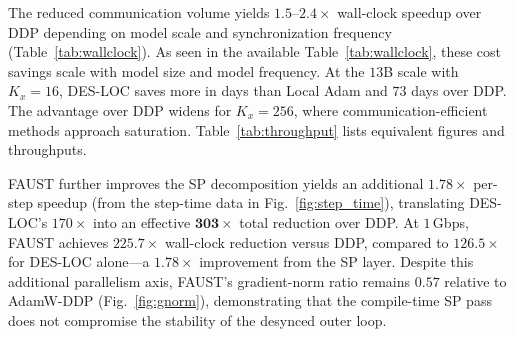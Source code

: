 \documentclass{article}
\begin{document}
The reduced communication volume yields $1.5$--$2.4{\times}$ wall-clock speedup over DDP depending on model scale and synchronization frequency (Table~\ref{tab:wallclock}).
As seen in the available Table~\ref{tab:wallclock}, these cost savings scale with model size and model frequency.
At the $13$B scale with $K_x = 16$, DES-LOC saves more in days than Local Adam and $73$ days
over DDP. The advantage over DDP widens for $K_x = 256$, where communication-efficient methods
approach saturation. Table~\ref{tab:throughput} lists equivalent figures and throughputs.

FAUST further improves the SP decomposition yields an additional $1.78\times$ per-step speedup (from the step-time
data in Fig.~\ref{fig:step_time}), translating DES-LOC's $170\times$ into an effective $\mathbf{303\times}$
total reduction over DDP. At $1$\,Gbps, FAUST  achieves $225.7\times$ wall-clock reduction
versus DDP, compared to $126.5\times$ for DES-LOC alone---a $1.78\times$ improvement from the SP layer.
Despite this additional parallelism axis, FAUST's gradient-norm ratio remains $0.57$ relative to
AdamW-DDP (Fig.~\ref{fig:gnorm}), demonstrating that the compile-time SP pass does not compromise
the stability of the desynced outer loop.

\end{document}
